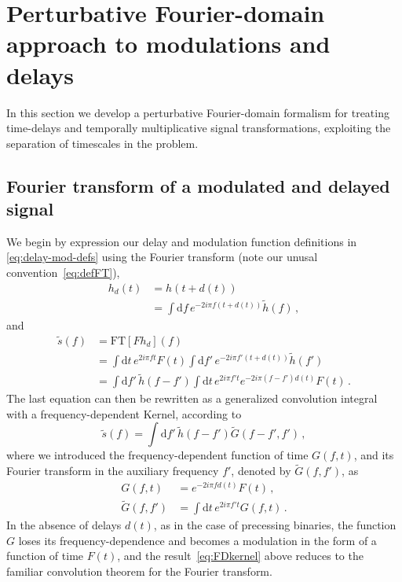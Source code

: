 \documentclass[aps,showpacs,twocolumn,
prd,superscriptaddress,nofootinbib]{revtex4-1}
\newcommand{\be}{\begin{equation}}
\newcommand{\ee}{\end{equation}}
\newcommand\ud{{\mathrm{d}}}
\newcommand{\nn}{\nonumber}
\begin{document}

\section{Perturbative Fourier-domain approach to modulations and delays}
\label{sec:formalism}


In this section we develop a perturbative Fourier-domain formalism for treating time-delays and temporally multiplicative signal transformations, exploiting the separation of timescales in the problem.

\subsection{Fourier transform of a modulated and delayed signal}
\label{subsec:FTgeneral}

We begin by expression our delay and modulation function definitions in \eqref{eq:delay-mod-defs} using the Fourier transform (note our unusal convention~\eqref{eq:defFT}),
\begin{align}
h_{d}(t) & =  h(t+d(t)) \nonumber\\
&=\int \ud f \, e^{-2i\pi f (t+d(t))}\tilde{h}(f) \,,
\end{align}
and
\begin{align}
  \tilde{s}(f) &= \mathrm{FT} \left[ F h_{d}\right] (f) \nn \\
  &= \int \ud t \, e^{2i\pi f t} F(t)  \int \ud f' \, e^{-2i\pi f' (t+d(t))}\tilde{h}(f') \nn\\
	&= \int \ud f' \, \tilde{h}(f-f') \int \ud t \, e^{2i\pi f' t} e^{-2i\pi (f-f') d(t)} F(t) \,.
\end{align}
The last equation can then be rewritten as a generalized convolution integral with a frequency-dependent Kernel, according to
\be\label{eq:FDkernel}
	\tilde{s}(f) = \int \ud f' \, \tilde{h}(f-f') \tilde{G}(f-f',f') \,,
\ee
where we introduced the frequency-dependent function of time $G(f,t)$, and its Fourier transform in the auxiliary frequency $f'$, denoted by $\tilde{G}(f,f')$, as
\begin{subequations}\label{eq:defG}
\begin{align}
	G(f,t) &= e^{-2i\pi f d(t)} F(t) \,, \\
	\tilde{G}(f,f') &= \int \ud t \, e^{2i\pi f' t} G(f,t) \,.
\end{align}
\end{subequations}
In the absence of delays $d(t)$, as in the case of precessing binaries, the function $G$ loses its frequency-dependence and becomes a modulation in the form of a function of time $F(t)$, and the result~\eqref{eq:FDkernel} above reduces to the familiar convolution theorem for the Fourier transform.
\end{document}

